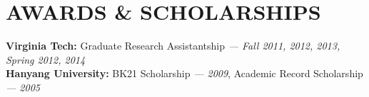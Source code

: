\section{AWARDS \& SCHOLARSHIPS}
\vspace{0.03in}
{\bf Virginia Tech:} Graduate Research Assistantship {\footnotesize{\it --- Fall
2011, 2012, 2013, Spring 2012, 2014}} \\
{\bf Hanyang University:} BK21 Scholarship {\footnotesize{\it --- 2009}},
Academic Record Scholarship {\footnotesize{\it --- 2005}}

